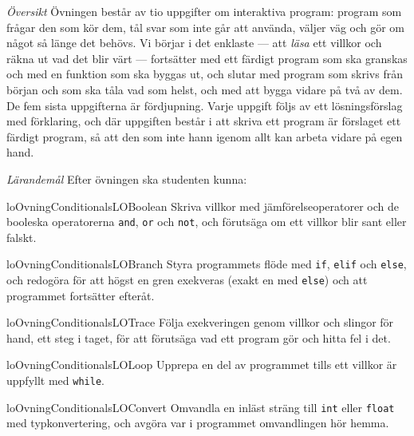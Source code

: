 \emph{Översikt}
Övningen består av tio uppgifter om interaktiva program: program som
frågar den som kör dem, tål svar som inte går att använda, väljer väg
och gör om något så länge det behövs.  Vi börjar i det enklaste --- att
\emph{läsa} ett villkor och räkna ut vad det blir värt --- fortsätter
med ett färdigt program som ska granskas och med en funktion som ska
byggas ut, och slutar med program som skrivs från början och som ska
tåla vad som helst, och med att bygga vidare på två av dem.  De fem
sista uppgifterna är fördjupning.  Varje uppgift följs av ett
lösningsförslag med förklaring, och där uppgiften består i att skriva
ett program är förslaget ett färdigt program, så att den som inte hann
igenom allt kan arbeta vidare på egen hand.

\emph{Lärandemål}
Efter övningen ska studenten kunna:
\begin{restatable}{lo}{OvningConditionalsLOBoolean}%
  \label{OvningConditionalsLOBoolean}%
  Skriva villkor med jämförelseoperatorer och de booleska operatorerna
  \texttt{and}, \texttt{or} och
  \texttt{not}, och förutsäga om ett villkor blir sant eller
  falskt.
\end{restatable}
\begin{restatable}{lo}{OvningConditionalsLOBranch}%
  \label{OvningConditionalsLOBranch}%
  Styra programmets flöde med \texttt{if},
  \texttt{elif} och \texttt{else}, och redogöra
  för att högst en gren exekveras (exakt en med
  \texttt{else}) och att programmet fortsätter efteråt.
\end{restatable}
\begin{restatable}{lo}{OvningConditionalsLOTrace}%
  \label{OvningConditionalsLOTrace}%
  Följa exekveringen genom villkor och slingor för hand, ett steg i
  taget, för att förutsäga vad ett program gör och hitta fel i det.
\end{restatable}
\begin{restatable}{lo}{OvningConditionalsLOLoop}%
  \label{OvningConditionalsLOLoop}%
  Upprepa en del av programmet tills ett villkor är uppfyllt med
  \texttt{while}.
\end{restatable}
\begin{restatable}{lo}{OvningConditionalsLOConvert}%
  \label{OvningConditionalsLOConvert}%
  Omvandla en inläst sträng till \texttt{int} eller
  \texttt{float} med typkonvertering, och avgöra var i
  programmet omvandlingen hör hemma.
\end{restatable}
